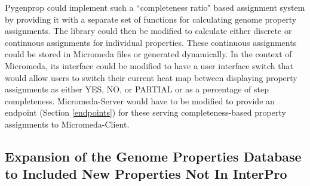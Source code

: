 Pygenprop could implement such a ``completeness ratio" based assignment system 
by providing it with a separate set of functions for calculating genome property 
assignments. The library could then be modified to calculate either discrete or 
continuous assignments for individual properties. These continuous assignments 
could be stored in Micromeda files or generated dynamically. In the context of 
Micromeda, its interface could be modified to have a user interface switch that 
would allow users to switch their current heat map between displaying property 
assignments as either YES, NO, or PARTIAL or as a percentage of step 
completeness. Micromeda-Server would have to be modified to provide an endpoint 
(Section \ref{endpoints}) for these serving completeness-based property 
assignments to Micromeda-Client.

\subsection{Expansion of the Genome Properties Database to Included New 
Properties Not In InterPro}

